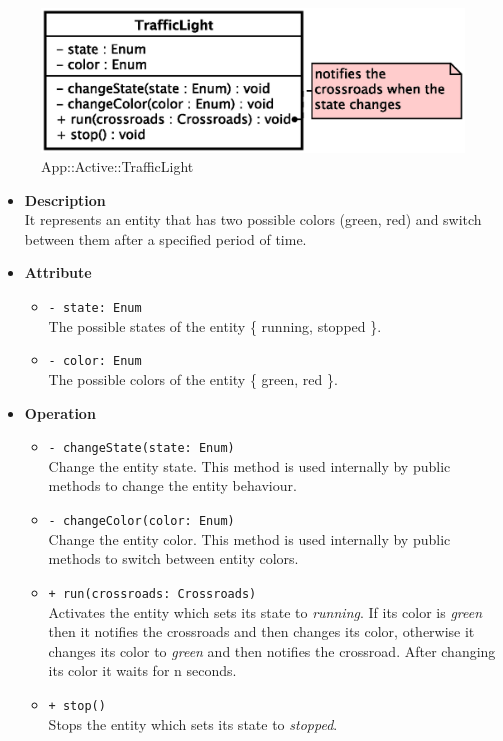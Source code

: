 \begin{figure}[h]
\centering
\includegraphics[scale=0.6,keepaspectratio]{images/solution/traffic_light.eps}
\caption{App::Active::TrafficLight}
\label{fig:sd-app-traffic-light}
\end{figure}
\FloatBarrier
\begin{itemize}
  \item \textbf{Description} \\
    It represents an entity that has two possible colors (green, red) and switch
between them after a specified period of time.
  \item \textbf{Attribute}
  \begin{itemize}
    \item \texttt{- state: Enum} \\
The possible states of the entity \{ running, stopped \}.
    \item \texttt{- color: Enum} \\
The possible colors of the entity \{ green, red \}.
  \end{itemize}
  \item \textbf{Operation}
  \begin{itemize} 
    \item \texttt{- changeState(state: Enum)} \\
Change the entity state. This method is used internally by public methods to 
change the entity behaviour.
    \item \texttt{- changeColor(color: Enum)} \\
Change the entity color. This method is used internally by public methods to 
switch between entity colors.
    \item \texttt{+ run(crossroads: Crossroads)} \\
Activates the entity which sets its state to \textit{running}. If its color is 
\textit{green} then it notifies the crossroads and then changes its color, 
otherwise it changes its color to \textit{green} and then notifies 
the crossroad. After changing its color it waits for n seconds.    
    \item \texttt{+ stop()} \\
Stops the entity which sets its state to \textit{stopped}.
  \end{itemize}
\end{itemize}
